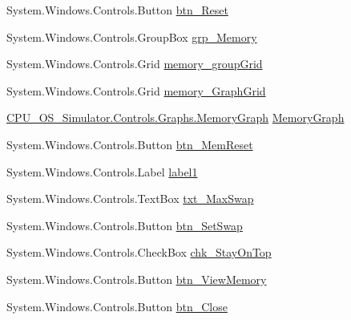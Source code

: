 \begin{DoxyCompactItemize}
\item 
System.\+Windows.\+Controls.\+Button \hyperlink{class_c_p_u___o_s___simulator_1_1_utilisation_window_a16d001bbb7b42530a56397f3339e3704}{btn\+\_\+\+Reset}
\item 
System.\+Windows.\+Controls.\+Group\+Box \hyperlink{class_c_p_u___o_s___simulator_1_1_utilisation_window_a8eb460220e13b601c32417a50f108590}{grp\+\_\+\+Memory}
\item 
System.\+Windows.\+Controls.\+Grid \hyperlink{class_c_p_u___o_s___simulator_1_1_utilisation_window_a4fb6d1f6970846264f1de50929230664}{memory\+\_\+group\+Grid}
\item 
System.\+Windows.\+Controls.\+Grid \hyperlink{class_c_p_u___o_s___simulator_1_1_utilisation_window_aa7e7647d26b40707fdbb58a182024cf2}{memory\+\_\+\+Graph\+Grid}
\item 
\hyperlink{class_c_p_u___o_s___simulator_1_1_controls_1_1_graphs_1_1_memory_graph}{C\+P\+U\+\_\+\+O\+S\+\_\+\+Simulator.\+Controls.\+Graphs.\+Memory\+Graph} \hyperlink{class_c_p_u___o_s___simulator_1_1_utilisation_window_aa26e672bc20df2926cc39de95dca5577}{Memory\+Graph}
\item 
System.\+Windows.\+Controls.\+Button \hyperlink{class_c_p_u___o_s___simulator_1_1_utilisation_window_adb923d9d563899c198d1dba63d5adb4b}{btn\+\_\+\+Mem\+Reset}
\item 
System.\+Windows.\+Controls.\+Label \hyperlink{class_c_p_u___o_s___simulator_1_1_utilisation_window_a72a3333fa298d3d899eb3380e4a54781}{label1}
\item 
System.\+Windows.\+Controls.\+Text\+Box \hyperlink{class_c_p_u___o_s___simulator_1_1_utilisation_window_a28206b9c624b718c2831c635e4169fe4}{txt\+\_\+\+Max\+Swap}
\item 
System.\+Windows.\+Controls.\+Button \hyperlink{class_c_p_u___o_s___simulator_1_1_utilisation_window_aa30361a85b16eec362b962731232111a}{btn\+\_\+\+Set\+Swap}
\item 
System.\+Windows.\+Controls.\+Check\+Box \hyperlink{class_c_p_u___o_s___simulator_1_1_utilisation_window_af6c82424ee215e1e4b287a8c9243efb5}{chk\+\_\+\+Stay\+On\+Top}
\item 
System.\+Windows.\+Controls.\+Button \hyperlink{class_c_p_u___o_s___simulator_1_1_utilisation_window_abba8c0f498289e16f1f0a5eb843b52ab}{btn\+\_\+\+View\+Memory}
\item 
System.\+Windows.\+Controls.\+Button \hyperlink{class_c_p_u___o_s___simulator_1_1_utilisation_window_a41d5528860b8810e5a197473fde5d9b3}{btn\+\_\+\+Close}
\end{DoxyCompactItemize}
